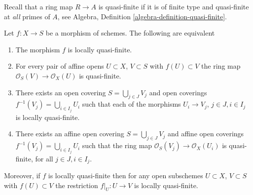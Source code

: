 \noindent
Recall that a ring map $R \to A$ is quasi-finite if it is
of finite type and quasi-finite at {\it all} primes of $A$, see
Algebra, Definition \ref{algebra-definition-quasi-finite}.

\begin{lemma}
\label{lemma-locally-quasi-finite-characterize}
Let $f : X \to S$ be a morphism of schemes.
The following are equivalent
\begin{enumerate}
\item The morphism $f$ is locally quasi-finite.
\item For every pair of affine opens $U \subset X$, $V \subset S$
with $f(U) \subset V$ the ring map
$\mathcal{O}_S(V) \to \mathcal{O}_X(U)$ is quasi-finite.
\item There exists an open covering $S = \bigcup_{j \in J} V_j$
and open coverings $f^{-1}(V_j) = \bigcup_{i \in I_j} U_i$ such
that each of the morphisms $U_i \to V_j$, $j\in J, i\in I_j$
is locally quasi-finite.
\item There exists an affine open covering $S = \bigcup_{j \in J} V_j$
and affine open coverings $f^{-1}(V_j) = \bigcup_{i \in I_j} U_i$ such
that the ring map $\mathcal{O}_S(V_j) \to \mathcal{O}_X(U_i)$ is
quasi-finite, for all $j\in J, i\in I_j$.
\end{enumerate}
Moreover, if $f$ is locally quasi-finite then for
any open subschemes $U \subset X$, $V \subset S$ with $f(U) \subset V$
the restriction $f|_U : U \to V$ is locally quasi-finite.
\end{lemma}


